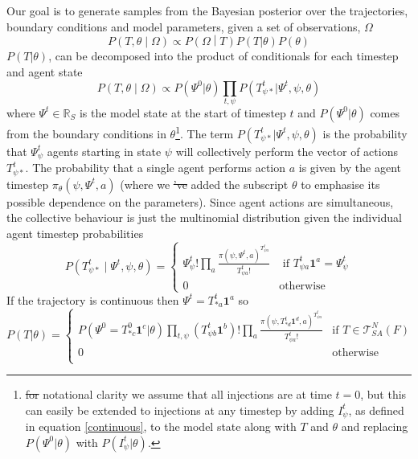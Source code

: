 \documentclass{article}
\providecommand{\DIFaddtex}[1]{{\protect\color{blue}\uwave{#1}}} %
\providecommand{\DIFdeltex}[1]{{\protect\color{red}\sout{#1}}}                      %
\providecommand{\DIFaddbegin}{} %
\providecommand{\DIFaddend}{} %
\providecommand{\DIFdelbegin}{} %
\providecommand{\DIFdelend}{} %
\providecommand{\DIFadd}[1]{\texorpdfstring{\DIFaddtex{#1}}{#1}} %
\providecommand{\DIFdel}[1]{\texorpdfstring{\DIFdeltex{#1}}{}} %
\newcommand{\DIFscaledelfig}{0.5}
\newlength{\DIFdelgraphicswidth} %
\newlength{\DIFdelgraphicsheight} %
\newcommand{\DIFaddincludegraphics}[2][]{{\color{blue}\fbox{\DIFOincludegraphics[#1]{#2}}}} %
\newcommand{\DIFdelincludegraphics}[2][]{%
\sbox{\DIFdelgraphicsbox}{\DIFOincludegraphics[#1]{#2}}%
\settoboxwidth{\DIFdelgraphicswidth}{\DIFdelgraphicsbox} %
\settoboxtotalheight{\DIFdelgraphicsheight}{\DIFdelgraphicsbox} %
\scalebox{\DIFscaledelfig}{%
\parbox[b]{\DIFdelgraphicswidth}{\usebox{\DIFdelgraphicsbox}\\[-\baselineskip] \rule{\DIFdelgraphicswidth}{0em}}\llap{\resizebox{\DIFdelgraphicswidth}{\DIFdelgraphicsheight}{%
\setlength{\unitlength}{\DIFdelgraphicswidth}%
\begin{picture}(1,1)%
\thicklines\linethickness{2pt} %
{\color[rgb]{1,0,0}\put(0,0){\framebox(1,1){}}}%
{\color[rgb]{1,0,0}\put(0,0){\line( 1,1){1}}}%
{\color[rgb]{1,0,0}\put(0,1){\line(1,-1){1}}}%
\end{picture}%
}\hspace*{3pt}}} %
} %
\DeclareRobustCommand{\DIFaddbegin}{\DIFOaddbegin \let\includegraphics\DIFaddincludegraphics} %
\DeclareRobustCommand{\DIFaddend}{\DIFOaddend \let\includegraphics\DIFOincludegraphics} %
\DeclareRobustCommand{\DIFdelbegin}{\DIFOdelbegin \let\includegraphics\DIFdelincludegraphics} %
\DeclareRobustCommand{\DIFdelend}{\DIFOaddend \let\includegraphics\DIFOincludegraphics} %
\begin{document}
Our goal is to generate samples from the Bayesian posterior over the trajectories, boundary conditions and model parameters, given a set of observations, $\Omega$
\[
P\left(T,\theta \middle| \Omega\right) \propto P\left(\Omega \middle| T\right)P(T|\theta)P(\theta)
\]
$P(T|\theta)$, can be decomposed into the product of conditionals for each timestep and agent state
\[
P\left(T,\theta \middle| \Omega\right) \propto  P(\Psi^0|\theta) \prod_{t,\psi} P(T^t_{\psi *} | \Psi^t,\psi,\theta)
\]
where $\Psi^t\in\mathbb{R}_S$ is the model state at the start of timestep $t$ and $P(\Psi^0|\theta)$ comes from the boundary conditions in $\theta$\footnote{\DIFdelbegin \DIFdel{for }\DIFdelend \DIFaddbegin \DIFadd{For }\DIFaddend notational clarity we assume that all injections are at time $t=0$, but this can easily be extended to injections at any timestep by adding $I^t_\psi$, as defined in equation \eqref{continuous}, to the model state along with $T$ and $\theta$ and replacing $P(\Psi^0|\theta)$ with $P(I^t_\psi|\theta)$.}.  The term $P(T^t_{\psi *} | \Psi^t,\psi,\theta)$ is the probability that $\Psi^t_\psi$ agents starting in state $\psi$ will collectively perform the vector of actions $T^t_{\psi *}$. The probability that a single agent performs action $a$ is given by the agent timestep $\pi_\theta(\psi,\Psi^t,a)$ (where we \DIFdelbegin \DIFdel{'ve }\DIFdelend \DIFaddbegin \DIFadd{have }\DIFaddend added the subscript $\theta$ to emphasise its possible dependence on the parameters). Since agent actions are simultaneous, the collective behaviour is just the multinomial distribution given the individual agent timestep probabilities
\begin{equation}
P\left(T^t_{\psi *} \mid \Psi^t, \psi, \theta\right) = 
\begin{cases}
\Psi^t_\psi!\prod_a \frac{\pi(\psi,\Psi^t,a)^{T^t_{\psi a}}}{T^t_{\psi a}!} & \text{ if } T^t_{\psi a}\mathbf{1}^a = \Psi^t_\psi \\
0 & \text{otherwise}
\end{cases}
\end{equation}
If the trajectory is continuous then $\Psi^t = T^t_{* a}\mathbf{1}^a$ so 
\begin{equation}
P(T|\theta) =
\begin{cases}
P(\Psi^0 = T^0_{* c}\mathbf{1}^c|\theta)
\prod_{t, \psi} \left(T^t_{\psi b} \mathbf{1}^b \right)!
\prod_{a} \frac{\pi(\psi, T^{t}_{* d}\mathbf{1}^d,a)^{T^{t}_{\psi a}}}{T^{t}_{\psi a}!} & \text{if } T \in \mathcal{T}^N_{SA}(F) \\
0 & \text{otherwise}\\
\end{cases}
\label{priorTrajectory}
\end{equation}
\end{document}
